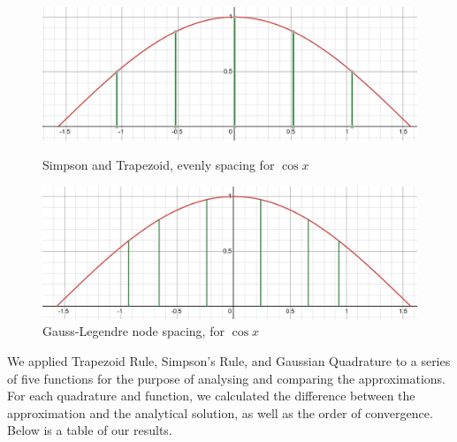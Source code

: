 \documentclass[12pt]{article}
\begin{document}
% 
% 
\begin{figure}[htbp]
	\begin{minipage}[b]{0.45\textwidth}
		\centering
		\includegraphics[width=\textwidth]{../images/Evenly_spaced.png} %
		\caption{Simpson and Trapezoid, evenly spacing for $\cos x$}
	\end{minipage}
	\hfill
	\begin{minipage}[b]{0.45\textwidth}
		\centering
		\includegraphics[width=\textwidth]{../images/GuassianQuad.png} %
		\caption{Gauss-Legendre node spacing, for $\cos x$}
	\end{minipage}
\end{figure}

We applied Trapezoid Rule, Simpson's Rule, and Gaussian Quadrature to a series of five functions for the purpose of
analysing and comparing the approximations. For each quadrature and function, we calculated the difference between
the approximation and the analytical solution, as well as the order of convergence. Below is a table of our results.
\end{document}
